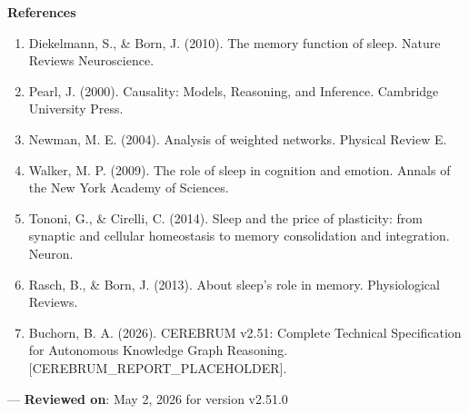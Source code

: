 \textbf{References}
\begin{enumerate}
\item Diekelmann, S., \& Born, J. (2010). The memory function of sleep. Nature Reviews Neuros\-cience.
\item Pearl, J. (2000). Causality: Models, Reasoning, and Inference. Cambridge University Press.
\item Newman, M. E. (2004). Analysis of weighted networks. Physical Review E.
\item Walker, M. P. (2009). The role of sleep in cognition and emotion. Annals of the New York Academy of Sciences.
\item Tononi, G., \& Cirelli, C. (2014). Sleep and the price of plasticity: from synaptic and cellular homeostasis to memory conso\-lidation and integration. Neuron.
\item Rasch, B., \& Born, J. (2013). About sleep's role in memory. Physio\-logical Reviews.
\item Buchorn, B. A. (2026). CEREBRUM v2.51: Complete Technical Specif\-ication for Autonomous Knowledge Graph Reasoning. [CEREBRUM\_REPORT\_PLACEHOLDER].

\end{enumerate}
---
\textbf{Reviewed on}: May 2, 2026 for version v2.51.0
